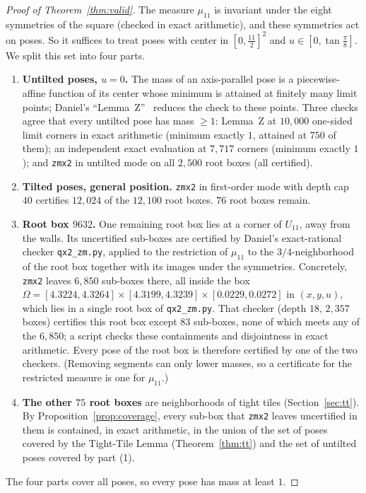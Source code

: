 \documentclass[11pt]{amsart}
\theoremstyle{definition}
\theoremstyle{remark}
\begin{document}
\begin{proof}[Proof of Theorem~\ref{thm:valid}]
The measure $\mu_{11}$ is invariant under the eight symmetries of the square (checked in exact arithmetic), and
these symmetries act on poses. So it suffices to treat poses with center in $[0,\frac{11}2]^2$ and
$u\in[0,\tan\frac\pi8]$. We split this set into four parts.

\begin{enumerate}
\item \textbf{Untilted poses, $u=0$.} The mass of an axis-parallel pose is a piecewise-affine function of its
center whose minimum is attained at finitely many limit points; Daniel's ``Lemma~Z''~\cite{daniel} reduces the check
to these points. Three checks agree that every untilted pose has mass $\ge1$: Lemma~Z at $10{,}000$ one-sided limit
corners in exact arithmetic (minimum exactly $1$, attained at $750$ of them); an independent exact evaluation at
$7{,}717$ corners (minimum exactly $1$); and \texttt{zmx2} in untilted mode on all $2{,}500$ root boxes (all
certified).
\item \textbf{Tilted poses, general position.} \texttt{zmx2} in first-order mode with depth cap $40$ certifies
$12{,}024$ of the $12{,}100$ root boxes. $76$ root boxes remain.
\item \textbf{Root box $9632$.} One remaining root box lies at a corner of $U_{11}$, away from the walls. Its
uncertified sub-boxes are certified by Daniel's exact-rational checker \texttt{qx2\_zm.py}, applied to the
restriction of $\mu_{11}$ to the $3/4$-neighborhood of the root box together with its images under the symmetries.
Concretely, \texttt{zmx2} leaves $6{,}850$ sub-boxes there, all inside the box
$\Omega=[4.3224,4.3264]\times[4.3199,4.3239]\times[0.0229,0.0272]$ in $(x,y,u)$, which lies in a single root box of
\texttt{qx2\_zm.py}. That checker (depth $18$, $2{,}357$ boxes) certifies this root box except $83$ sub-boxes, none of which
meets any of the $6{,}850$; a script checks these containments and disjointness in exact arithmetic. Every pose of
the root box is therefore certified by one of the two checkers. (Removing segments can only lower masses, so a
certificate for the restricted measure is one for $\mu_{11}$.)
\item \textbf{The other $75$ root boxes} are neighborhoods of tight tiles (Section~\ref{sec:tt}). By
Proposition~\ref{prop:coverage}, every sub-box that \texttt{zmx2} leaves uncertified in them is contained, in exact
arithmetic, in the union of the set of poses covered by the Tight-Tile Lemma (Theorem~\ref{thm:tt}) and the set of
untilted poses covered by part (1).
\end{enumerate}
The four parts cover all poses, so every pose has mass at least $1$.
\end{proof}
\end{document}
